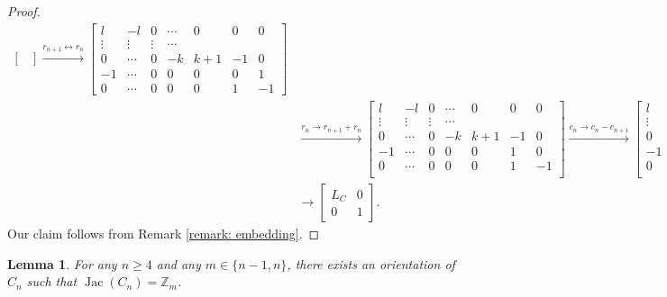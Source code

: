\documentclass[11pt,reqno]{amsart}
\DeclareMathOperator{\Jac}{Jac}
\newcommand{\Z}{\mathbb{Z}}
\theoremstyle{definition}
\theoremstyle{plain}
\newtheorem{lem}[mydef]{Lemma}
\begin{document}
\begin{proof}
\begin{align}
\begin{bmatrix}
			\end{bmatrix} \stackrel{r_{n+1}\leftrightarrow r_{n}}{\longrightarrow}
			\begin{bmatrix} 
				l  & -l & 0 & \cdots & 0 & 0 & 0 \\
				\vdots & \vdots & \vdots & \cdots \\
				0 & \cdots & 0 & -k & k+1 & -1 & 0  \\
				-1 & \cdots & 0 & 0 & 0 & 0 & 1 \\
				0 & \cdots & 0 & 0 & 0 & 1 & -1 
			\end{bmatrix} \\ 
			&\stackrel{r_{n} \to r_{n+1} + r_{n}}\longrightarrow 
			\begin{bmatrix} 
				l  & -l & 0 & \cdots & 0 & 0 & 0 \\
				\vdots & \vdots & \vdots & \cdots \\
				0 & \cdots & 0 & -k & k+1 & -1 & 0  \\
				-1 & \cdots & 0 & 0 & 0 & 1 & 0 \\ 
				0 & \cdots & 0 & 0 & 0 & 1 & -1 \\ 
			\end{bmatrix}
			\stackrel{c_{n} \to c_{n} - c_{n+1}}\longrightarrow 
			\begin{bmatrix} 
				l  & -l & 0 & \cdots & 0 & 0 & 0 \\
				\vdots & \vdots & \vdots & \cdots \\
				0 & \cdots & 0 & -k & k+1 & -1 & 0  \\
				-1 & \cdots & 0 & 0 & 0 & 1 & 0 \\ 
				0 & \cdots & 0 & 0 & 0 & 0 & -1 \\ 
			\end{bmatrix} \\
			&\longrightarrow 
			\left[ \begin{array}{c|c}
				L_C & 0 \\
				\hline
				0 & 1
			\end{array} \right].
			\end{align}
Our claim follows from Remark \ref{remark: embedding}. 
		\end{proof}

\begin{lem} \label{obj4}
			For any $n \ge 4$ and any $m \in \{ n-1, n \}$, there exists an orientation of $C_n$ such that $\Jac (C_n) = \Z_m$. 
		\end{lem}
\end{document}
